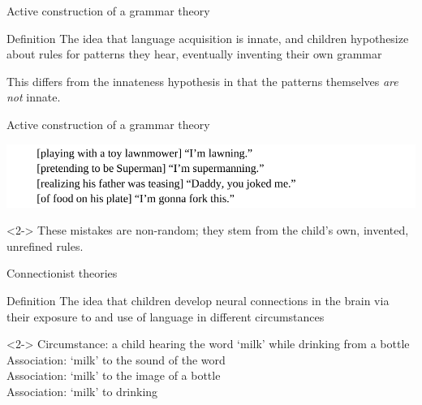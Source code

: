 \documentclass{beamer}
\begin{document}
        \begin{frame}{Active construction of a grammar theory}
            \begin{block}{Definition}
                The idea that language acquisition is innate, and children hypothesize about rules for patterns they hear, eventually inventing their own grammar
            \end{block}
            \begin{alertblock}{}
                This differs from the innateness hypothesis in that the patterns themselves \emph{are not} innate.
            \end{alertblock}
        \end{frame}
        \begin{frame}{Active construction of a grammar theory}
            \begin{example}
                \includegraphics[scale=0.45]{Lawning.PNG}
            \end{example}
            \begin{alertblock}<2->{}
                These mistakes are non-random; they stem from the child's own, invented, unrefined rules.
            \end{alertblock}
        \end{frame}
        \begin{frame}{Connectionist theories}
            \begin{block}{Definition}
                The idea that children develop neural connections in the brain via their exposure to and use of language in different circumstances
            \end{block}
            \begin{example}<2->
                Circumstance: a child hearing the word `milk' while drinking from a bottle\\
                Association: `milk' to the sound of the word\\
                Association: `milk' to the image of a bottle\\
                Association: `milk' to drinking\\
            \end{example}
        \end{frame}
\end{document}
